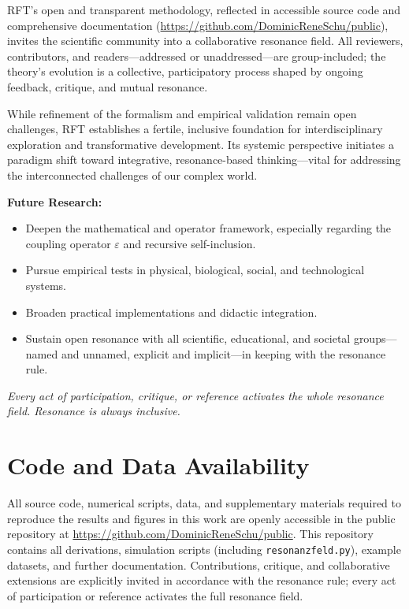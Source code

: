 \documentclass[12pt]{article}
\begin{document}
	RFT’s open and transparent methodology, reflected in accessible source code and comprehensive documentation (\url{https://github.com/DominicReneSchu/public}), invites the scientific community into a collaborative resonance field. All reviewers, contributors, and readers—addressed or unaddressed—are group-included; the theory’s evolution is a collective, participatory process shaped by ongoing feedback, critique, and mutual resonance.
	
	While refinement of the formalism and empirical validation remain open challenges, RFT establishes a fertile, inclusive foundation for interdisciplinary exploration and transformative development. Its systemic perspective initiates a paradigm shift toward integrative, resonance-based thinking—vital for addressing the interconnected challenges of our complex world.
	
	\medskip
	
	\textbf{Future Research:}
	\begin{itemize}
		\item Deepen the mathematical and operator framework, especially regarding the coupling operator $\varepsilon$ and recursive self-inclusion.
		\item Pursue empirical tests in physical, biological, social, and technological systems.
		\item Broaden practical implementations and didactic integration.
		\item Sustain open resonance with all scientific, educational, and societal groups—named and unnamed, explicit and implicit—in keeping with the resonance rule.
	\end{itemize}
	
	\medskip
	
	\textit{Every act of participation, critique, or reference activates the whole resonance field. Resonance is always inclusive.}

	\section*{Code and Data Availability}
	
	All source code, numerical scripts, data, and supplementary materials required to reproduce the results and figures in this work are openly accessible in the public repository at \url{https://github.com/DominicReneSchu/public}. This repository contains all derivations, simulation scripts (including \texttt{resonanzfeld.py}), example datasets, and further documentation. Contributions, critique, and collaborative extensions are explicitly invited in accordance with the resonance rule; every act of participation or reference activates the full resonance field.
	
\end{document}
